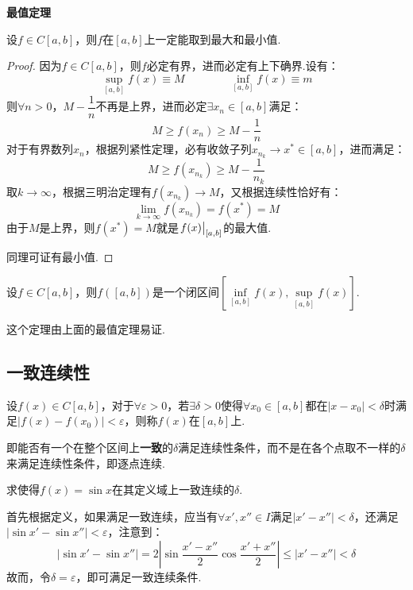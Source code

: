 \begin{theorem}
    \label{thm:TheMostValuableTheorem}
    \textbf{最值定理}

    设$f \in C[a,b]$，则$f$在$[a,b]$上一定能取到最大和最小值.
\end{theorem}

\begin{proof}
    因为$f \in C[a,b]$，则$f$必定有界，进而必定有上下确界.设有：
    \[\sup_{[a,b]}f(x) \equiv M \qquad\qquad \inf_{[a,b]}f(x) \equiv m\]
    则$\forall n>0$，$M-\dfrac{1}{n}$不再是上界，进而必定$\exists x_n \in [a,b]$满足：
    \[M \geqslant f(x_n) \geqslant M-\frac{1}{n}\]
    对于有界数列$x_n$，根据列紧性定理，必有收敛子列$x_{n_k} \to x^* \in [a,b]$，进而满足：
    \[M \geqslant f(x_{n_k}) \geqslant M-\frac{1}{n_k}\]
    取$k\to\infty$，根据三明治定理有$f(x_{n_k})\to M$，又根据连续性恰好有：
    \[\lim_{k\to\infty}f(x_{n_k}) = f(x^*) = M\]
    由于$M$是上界，则$f(x^*)=M$就是$\eval{f(x)}_{[a,b]}$的最大值.

    同理可证有最小值.
\end{proof}

\begin{theorem}
    设$f \in C[a,b]$，则$f([a,b])$是一个闭区间$\left[\inf\limits_{[a,b]}f(x),\sup\limits_{[a,b]}f(x)\right]$.
\end{theorem}

这个定理由上面的最值定理易证.


\subsection{一致连续性}
\begin{definition}
    设$f(x) \in C[a,b]$，对于$\forall \varepsilon > 0$，若$\exists \delta > 0$使得$\forall x_0 \in [a,b]$都在$|x-x_0|<\delta$时满足$|f(x)-f(x_0)|<\varepsilon$，则称$f(x)$在$[a,b]$上.
\end{definition}

即能否有一个在整个区间上\textbf{一致}的$\delta$满足连续性条件，而不是在各个点取不一样的$\delta$来满足连续性条件，即逐点连续.

\begin{question}
    求使得$f(x)=\sin x$在其定义域上一致连续的$\delta$.
\end{question}

\begin{solution}
    首先根据定义，如果满足一致连续，应当有$\forall x',x'' \in I$满足$|x'-x''|<\delta$，还满足$|\sin x' - \sin x''|<\varepsilon$，注意到：
    \[|\sin x' - \sin x''| = 2\left|\sin\frac{x'-x''}{2}\cos\frac{x'+x''}{2}\right|\leqslant|x'-x''|<\delta\]
    故而，令$\delta=\varepsilon$，即可满足一致连续条件.
\end{solution}

